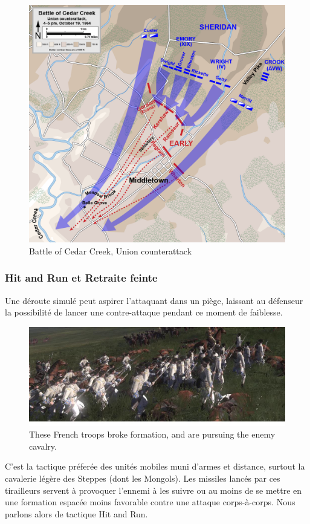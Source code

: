 \documentclass{article}
\begin{document}
\begin{center}
\begin{figure}[H]
\begin{minipage}[H]{0.45\linewidth}
	\includegraphics[width=\linewidth]{../ressources/Cedar_Creek_Union_counterattack}
	\caption{Battle of Cedar Creek, Union counterattack}
\end{minipage}
\hfill
\end{figure}
\cite{counterattack_wiki, couterattack_cedar_creek}
\end{center}

\subsubsection{Hit and Run et Retraite feinte}
Une déroute simulé peut aspirer l'attaquant dans un piège, laissant au défenseur la possibilité de lancer une contre-attaque pendant ce moment de faiblesse.
\begin{figure}[H]
	\begin{centering}
	\includegraphics[width=\linewidth]{../ressources/infantrysquare3}
	\caption{These French troops broke formation, and are pursuing the enemy cavalry. \cite{feigned_retreat}}
	\end{centering}
\end{figure}
\cite{mongol_army}
C'est la tactique préferée des unités mobiles muni d'armes et distance, surtout la cavalerie légère des Steppes (dont les Mongols). Les missiles lancés par ces tirailleurs servent à provoquer l'ennemi à les suivre ou au moins de se mettre en une formation espacée moins favorable contre une attaque corps-à-corps. Nous parlons alors de tactique Hit and Run.
\end{document}
